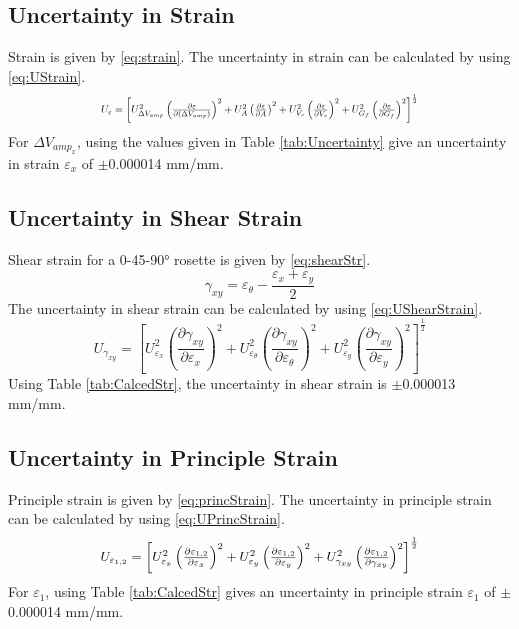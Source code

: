 \documentclass[10pt,journal,letterpaper]{IEEEtran}
\begin{document}
\subsection*{Uncertainty in Strain}

Strain is given by \eqref{eq:strain}.
The uncertainty in strain can be calculated by using \eqref{eq:UStrain}.
\begin{equation}
\label{eq:UStrain}
\resizebox{227pt}{!}{$U_{\varepsilon}=\left[U_{\Delta V_{amp}}^2 \left(\frac{\partial \varepsilon}{\partial (\Delta V_{amp})}\right)^2 + U_{A}^2 \left(\frac{\partial \varepsilon}{\partial A}\right)^2 + U_{V_s}^2 \left(\frac{\partial \varepsilon}{\partial V_s}\right)^2 + U_{G_f}^2 \left(\frac{\partial \varepsilon}{\partial G_f}\right)^2 \right]^{\frac{1}{2}}$}
\end{equation}
For $\Delta V_{amp_{x}}$, using the values given in Table \ref{tab:Uncertainty} give an uncertainty in strain $\varepsilon_x$ of $\pm$0.000014 mm/mm.

\subsection*{Uncertainty in Shear Strain}

Shear strain for a 0-45-\ang{90} rosette is given by \eqref{eq:shearStr}.
\begin{equation}
\label{eq:shearStr}
\gamma_{xy}=\varepsilon_\theta - \frac{\varepsilon_x+\varepsilon_y}{2}
\end{equation}
The uncertainty in shear strain can be calculated by using \eqref{eq:UShearStrain}.
\begin{equation}
\label{eq:UShearStrain}
U_{\gamma_{xy}}=\left[U_{\varepsilon_x}^2 \left(\frac{\partial \gamma_{xy}}{\partial \varepsilon_x}\right)^2 + U_{\varepsilon_\theta}^2 \left(\frac{\partial \gamma_{xy}}{\partial \varepsilon_\theta}\right)^2 + U_{\varepsilon_y}^2 \left(\frac{\partial \gamma_{xy}}{\partial \varepsilon_y}\right)^2 \right]^{\frac{1}{2}}
\end{equation}
Using Table \ref{tab:CalcedStr}, the uncertainty in shear strain is $\pm$0.000013 mm/mm.

\subsection*{Uncertainty in Principle Strain}

Principle strain is given by \eqref{eq:princStrain}.
The uncertainty in principle strain can be calculated by using \eqref{eq:UPrincStrain}.
\begin{equation}
\label{eq:UPrincStrain}
\resizebox{227pt}{!}{$U_{\varepsilon_{1,2}}=\left[U_{\varepsilon_x}^2 \left(\frac{\partial \varepsilon_{1,2}}{\partial \varepsilon_x}\right)^2 + U_{\varepsilon_y}^2 \left(\frac{\partial \varepsilon_{1,2}}{\partial \varepsilon_y}\right)^2 + U_{\gamma_{xy}}^2 \left(\frac{\partial \varepsilon_{1,2}}{\partial \gamma_{xy}}\right)^2 \right]^{\frac{1}{2}}$}
\end{equation}
For $\varepsilon_1$, using Table \ref{tab:CalcedStr} gives an uncertainty in principle strain $\varepsilon_1$ of $\pm$0.000014 mm/mm.
\end{document}
